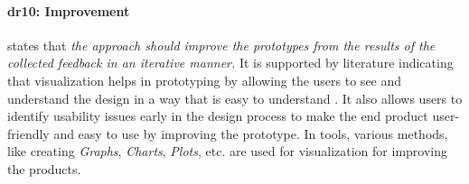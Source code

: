 \paragraph{\ac{dr}10: Improvement} states that \textit{the approach should improve the prototypes from the results of the collected feedback in an iterative manner.} 
It is supported by literature indicating that visualization helps in prototyping by allowing the users to see and understand the design in a way that is easy to understand \cite{article:comparative:prototypes}.
It also allows users to identify usability issues \cite{article:prototyping:gould} early in the design process to make the end product user-friendly and easy to use by improving the prototype.
In tools, various methods, like creating \textit{Graphs}, \textit{Charts}, \textit{Plots}, etc. are used for visualization for improving the products.



\clearpage
